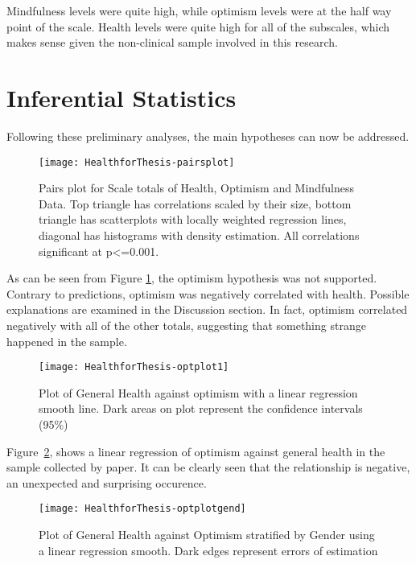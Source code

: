 \documentclass{article}
\begin{document}
Mindfulness levels were quite high, while optimism levels were
at the half way point of the scale. Health levels were quite high for all of the subscales, which makes sense given the non-clinical sample involved in this research. 



\section{Inferential Statistics}

Following these preliminary analyses, the main hypotheses can now
be addressed.



\begin{figure}
\texttt{[image: HealthforThesis-pairsplot]}
\caption{Pairs plot for Scale totals of Health, Optimism and Mindfulness Data.  Top triangle has correlations scaled by their size, bottom triangle has scatterplots with locally weighted regression lines, diagonal has histograms with density estimation. All correlations significant at p<=0.001.}
\label{fig:pairsplot}
\end{figure}





As can be seen from Figure \ref{fig:pairsplot}, the optimism hypothesis
was not supported.  Contrary to predictions, optimism was negatively
correlated with health.
Possible explanations are examined in the Discussion section.  In fact, optimism correlated negatively with all of the other totals, suggesting that something strange happened in the sample.

\begin{figure}
\texttt{[image: HealthforThesis-optplot1]}
  \caption{Plot of General Health against optimism with a linear regression smooth line. Dark areas on plot represent the confidence intervals (95\%)}
  \label{fig:optplot1}
\end{figure}


Figure~\ref{fig:optplot1}, shows a linear regression of optimism against general health in the sample collected by paper.  It can be clearly seen that the relationship is negative, an unexpected and surprising occurence.  %




\begin{figure}
\texttt{[image: HealthforThesis-optplotgend]}
  \caption{Plot of General Health against Optimism stratified by Gender using a linear regression smooth. Dark edges represent errors of estimation}
  \label{fig:optplotgend}
\end{figure}
\end{document}
